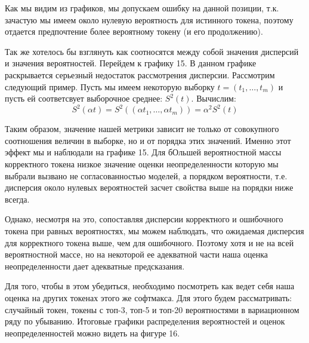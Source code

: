 \documentclass[a4paper,14pt]{extarticle}
\begin{document}
	Как мы видим из графиков, мы допускаем ошибку на данной позиции, т.к. зачастую мы имеем около нулевую вероятность для истинного токена, поэтому отдается предпочтение более вероятному токену (и его продолжению).
	
	\begin{figure}[t]
	\end{figure}
	Так же хотелось бы взглянуть как соотносятся между собой значения дисперсий и значения вероятностей. Перейдем к графику 15. В данном графике раскрывается серьезный недостаток рассмотрения дисперсии. Рассмотрим следующий пример. Пусть мы имеем некоторую выборку $t = (t_1, \dots, t_m)$ и пусть ей соответсвует выборочное среднее: $S^2(t)$. Вычислим:
	\begin{equation*}
		S^2(\alpha t) = S^2((\alpha t_1, \dots, \alpha t_m)) = \alpha^2 S^2(t)
	\end{equation*}
	
	Таким образом, значение нашей метрики зависит не только от совокупного соотношения величин в выборке, но и от порядка этих значений. Именно этот эффект мы и наблюдали на графике 15. Для бОльшей вероятностной массы корректного токена низкое значение оценки неопределенности которую мы выбрали вызвано не согласованностью моделей, а порядком вероятности, т.е. дисперсия около нулевых вероятностей засчет свойства выше на порядки ниже всегда.
	
	Однако, несмотря на это, сопоставляя дисперсии корректного и ошибочного токена при равных вероятностях, мы можем наблюдать, что ожидаемая дисперсия для корректного токена выше, чем для ошибочного. Поэтому хотя и не на всей вероятностной массе, но на некоторой ее адекватной части наша оценка неопределенности дает адекватные предсказания.
	
	Для того, чтобы в этом убедиться, необходимо посмотреть как ведет себя наша оценка на других токенах этого же софтмакса. Для этого будем рассматривать: случайный токен, токены с топ-3, топ-5 и топ-20 вероятностями в вариационном ряду по убыванию. Итоговые графики распределения вероятностей и оценок неопределенностей можно видеть на фигуре 16.
	
\end{document}
